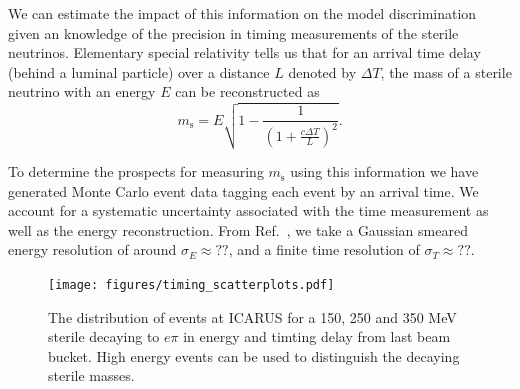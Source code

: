 \documentclass[11pt, a4paper]{article}
\newcommand{\refref}[1]{Ref.~\cite{#1}}
\begin{document}
We can estimate the impact of this information on the model discrimination
given an knowledge of the precision in timing measurements of the sterile
neutrinos. Elementary special relativity tells us that for an arrival time delay (behind a luminal particle) over a distance $L$ denoted by $\Delta T$, the mass of a sterile neutrino with an energy $E$ can be reconstructed as 
%
%
\[ m_\text{s} = E\sqrt{1-\frac{1}{\left(1+\frac{c\Delta T}{L}\right)^2}}. \]

To determine the prospects for measuring $m_\text{s}$ using this information we
have generated Monte Carlo event data tagging each event by an arrival time.
We account for a systematic uncertainty associated with the time measurement as
well as the energy reconstruction. From \refref{WHERE}, we take a Gaussian
smeared energy resolution of around $\sigma_E \approx ??$, and a finite time
resolution of $\sigma_T  \approx ??$. \\


\begin{figure}[t]
\center
\texttt{[image: figures/timing\_scatterplots.pdf]}
\caption{\label{fig:tof_scatter} The distribution of events at ICARUS for a 150, 250 and 350 MeV sterile decaying to $e \pi$ in energy and timting delay from last beam bucket. High energy events can be used to distinguish the decaying sterile masses.}
\end{figure}


\end{document}
